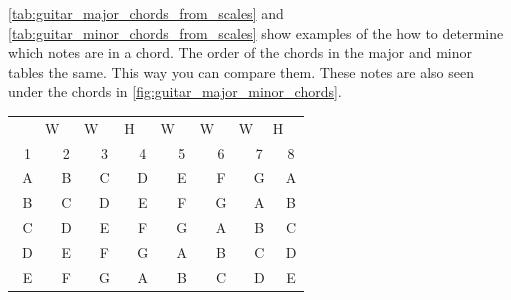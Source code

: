 \autoref{tab:guitar_major_chords_from_scales} and \autoref{tab:guitar_minor_chords_from_scales} show examples of the how to determine which notes are in a chord. The order of the chords in the major and minor tables the same. This way you can compare them. These notes are also seen under the chords in \autoref{fig:guitar_major_minor_chords}.

\begin{table}[h]
	\begin{minipage}{0.45\textwidth}
				\centering
		\begin{tabular}{*{16}{c}}
			& \multicolumn{2}{P{4mm}}{\large{W}} & \multicolumn{2}{P{4mm}}{\large{W}} & \multicolumn{2}{P{4mm}}{\large{H}} & \multicolumn{2}{P{4mm}}{\large{W}} & \multicolumn{2}{P{4mm}}{\large{W}} & \multicolumn{2}{P{4mm}}{\large{W}} & \multicolumn{2}{P{4mm}}{\large{H}} & \\
			\multicolumn{2}{P{4mm}}{1} & \multicolumn{2}{P{4mm}}{2} & \multicolumn{2}{P{4mm}}{3} & \multicolumn{2}{P{4mm}}{4} & \multicolumn{2}{P{4mm}}{5} & \multicolumn{2}{P{4mm}}{6} & \multicolumn{2}{P{4mm}}{7} & \multicolumn{2}{P{4mm}}{8} \\
			\multicolumn{2}{P{4mm}}{\ScaleRootCellFill A} & \multicolumn{2}{P{4mm}}{B} & \multicolumn{2}{P{4mm}}{\ScaleCellFill C\sharp} & \multicolumn{2}{P{4mm}}{D} & \multicolumn{2}{P{4mm}}{\ScaleCellFill E} & \multicolumn{2}{P{4mm}}{F\sharp} & \multicolumn{2}{P{4mm}}{G\sharp} & \multicolumn{2}{P{4mm}}{A} \\
			\multicolumn{2}{P{4mm}}{\ScaleRootCellFill B} & \multicolumn{2}{P{4mm}}{C\sharp} & \multicolumn{2}{P{4mm}}{\ScaleCellFill D\sharp} & \multicolumn{2}{P{4mm}}{E} & \multicolumn{2}{P{4mm}}{\ScaleCellFill F\sharp} & \multicolumn{2}{P{4mm}}{G\sharp} & \multicolumn{2}{P{4mm}}{A\sharp} & \multicolumn{2}{P{4mm}}{B} \\
			\multicolumn{2}{P{4mm}}{\ScaleRootCellFill C} & \multicolumn{2}{P{4mm}}{D} & \multicolumn{2}{P{4mm}}{\ScaleCellFill E} & \multicolumn{2}{P{4mm}}{F} & \multicolumn{2}{P{4mm}}{\ScaleCellFill G} & \multicolumn{2}{P{4mm}}{A} & \multicolumn{2}{P{4mm}}{B} & \multicolumn{2}{P{4mm}}{C} \\
			\multicolumn{2}{P{4mm}}{\ScaleRootCellFill D} & \multicolumn{2}{P{4mm}}{E} & \multicolumn{2}{P{4mm}}{\ScaleCellFill F\sharp} & \multicolumn{2}{P{4mm}}{G} & \multicolumn{2}{P{4mm}}{\ScaleCellFill A} & \multicolumn{2}{P{4mm}}{B} & \multicolumn{2}{P{4mm}}{C\sharp} & \multicolumn{2}{P{4mm}}{D} \\
			\multicolumn{2}{P{4mm}}{\ScaleRootCellFill E} & \multicolumn{2}{P{4mm}}{F\sharp} & \multicolumn{2}{P{4mm}}{\ScaleCellFill G\sharp} & \multicolumn{2}{P{4mm}}{A} & \multicolumn{2}{P{4mm}}{\ScaleCellFill B} & \multicolumn{2}{P{4mm}}{C\sharp} & \multicolumn{2}{P{4mm}}{D\sharp} & \multicolumn{2}{P{4mm}}{E} \\

\end{tabular}
\end{minipage}
\end{table}
